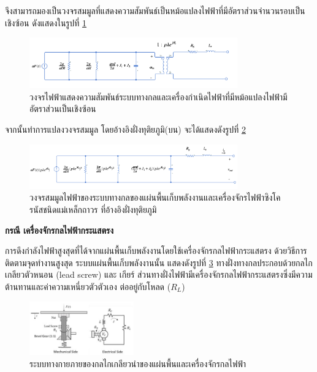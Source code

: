 \documentclass[11pt,a4paper]{article}
\begin{document}
จึงสามารถมองเป็นวงจรสมมูลที่แสดงความสัมพันธ์เป็นหม้อแปลงไฟฟ้าที่มีอัตราส่วนจำนวนรอบเป็นเชิงซ้อน ดังแสดงในรูปที่ \ref{ac_trans}
\begin{figure}[H]
    \begin{center}
        \includegraphics[width=0.8\textwidth]{ac_trans.png}
    \end{center}
    \caption{วงจรไฟฟ้าแสดงความสัมพันธ์ระบบทางกลและเครื่องกำเนิดไฟฟ้าที่มีหม้อแปลงไฟฟ้ามีอัตราส่วนเป็นเชิงซ้อน}
    \label{ac_trans}
\end{figure}

จากนั้นทำการแปลงวงจรสมมูล โดยอ้างอิงฝั่งทุติยภูมิ(บน) จะได้แสดงดังรูปที่ \ref{ac_eq_circuit}
\begin{figure}[H]
    \begin{center}
        \includegraphics[width=0.8\textwidth]{ac_eq_circuit.png}
    \end{center}
    \caption{วงจรสมมูลไฟฟ้าของระบบทางกลของแผ่นพื้นเก็บพลังงานและเครื่องจักรไฟฟ้าซิงโครนัสชนิดแม่เหล็กถาวร ที่อ้างอิงฝั่งทุติยภูมิ}
    \label{ac_eq_circuit}
\end{figure}

\textbf{กรณี เครื่องจักรกลไฟฟ้ากระแสตรง}

การดึงกำลังไฟฟ้าสูงสุดที่ได้จากแผ่นพื้นเก็บพลังงานโดยใช้เครื่องจักรกลไฟฟ้ากระแสตรง ด้วยวิธีการติดตามจุดทำงานสูงสุด
ระบบแผ่นพื้นเก็บพลังงานนั้น แสดงดังรูปที่ \ref{mech_and_dc_motor} ทางฝั่งทางกลประกอบด้วยกลไกเกลียวตัวหนอน (lead screw) และ เกียร์ ส่วนทางฝั่งไฟฟ้ามีเครื่องจักรกลไฟฟ้ากระแสตรงซึ่งมีความต้านทานและค่าความเหนี่ยวตัวตัวเอง ต่ออยู่กับโหลด ($R_{L}$) 
\begin{figure}[H]
    \begin{center}
        \includegraphics[width=0.4\textwidth]{mech_and_dc_motor.jpg}
    \end{center}
    \caption{ระบบทางกายภายของกลไกเกลียวนำของแผ่นพื้นและเครื่องจักรกลไฟฟ้า}
    \label{mech_and_dc_motor}
\end{figure}
\end{document}
